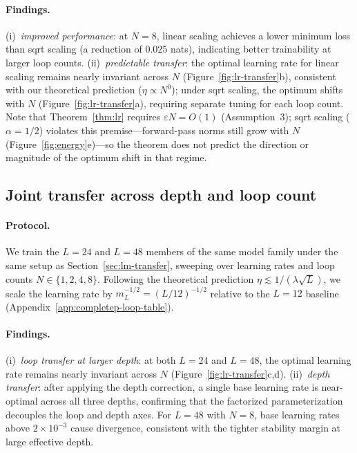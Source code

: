 \paragraph{Findings.}

(i)~\emph{improved performance}: at $N=8$, linear scaling achieves a lower minimum loss than sqrt scaling (a reduction of $0.025$ nats), indicating better trainability at larger loop counts.
(ii)~\emph{predictable transfer}: the optimal learning rate for linear scaling remains nearly invariant across $N$ (Figure~\ref{fig:lr-transfer}b), consistent with our theoretical prediction ($\eta \propto N^0$); under sqrt scaling, the optimum shifts with $N$ (Figure~\ref{fig:lr-transfer}a), requiring separate tuning for each loop count.
Note that Theorem~\ref{thm:lr} requires $\varepsilon N = O(1)$ (Assumption~3); sqrt scaling ($\alpha{=}1/2$) violates this premise---forward-pass norms still grow with $N$ (Figure~\ref{fig:energy}e)---so the theorem does not predict the direction or magnitude of the optimum shift in that regime.

\subsection{Joint transfer across depth and loop count}
\label{sec:depth-scaling}

\paragraph{Protocol.}
We train the $L{=}24$ and $L{=}48$ members of the same model family under the same setup as Section~\ref{sec:lm-transfer}, sweeping over learning rates and loop counts $N\in\{1,2,4,8\}$.
Following the theoretical prediction $\eta\lesssim 1/(\lambda\sqrt{L})$, we scale the learning rate by $m_L^{-1/2}=(L/12)^{-1/2}$ relative to the $L{=}12$ baseline (Appendix~\ref{app:completep-loop-table}).

\paragraph{Findings.}
(i)~\emph{loop transfer at larger depth}: at both $L{=}24$ and $L{=}48$, the optimal learning rate remains nearly invariant across $N$ (Figure~\ref{fig:lr-transfer}c,d).
(ii)~\emph{depth transfer}: after applying the depth correction, a single base learning rate is near-optimal across all three depths, confirming that the factorized parameterization decouples the loop and depth axes.
For $L{=}48$ with $N{=}8$, base learning rates above $2\!\times\!10^{-3}$ cause divergence, consistent with the tighter stability margin at large effective depth.


